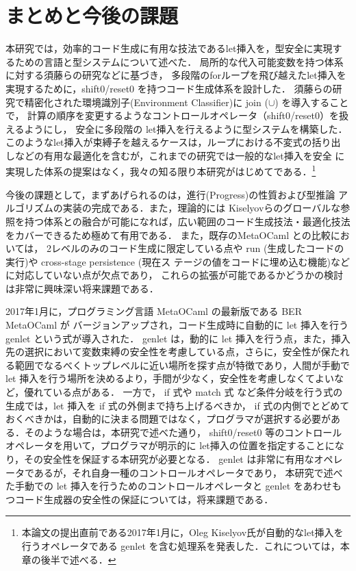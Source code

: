 \chapter{まとめと今後の課題}
\label{cha:conc}
本研究では，効率的コード生成に有用な技法であるlet挿入を，型安全に実現す
るための言語と型システムについて述べた．
局所的な代入可能変数を持つ体系に対する須藤らの研究\cite{Sudo2014}などに基づき，
多段階のforループを飛び越えたlet挿入を実現するために，shift0/reset0 を持つコード生成体系を設計した．
須藤らの研究で精密化された環境識別子(Environment Classifier)に join ($\cup$) を導入することで，
計算の順序を変更するようなコントロールオペレータ（shift0/reset0）を扱えるようにし，
安全に多段階の let挿入を行えるように型システムを構築した．
このようなlet挿入が束縛子を越えるケースは，ループにおける不変式の括り出
しなどの有用な最適化を含むが，これまでの研究では一般的なlet挿入を安全
に実現した体系の提案はなく，我々の知る限り本研究がはじめてである．\footnote{本論文の提出直前である2017年1月に，Oleg Kiselyov氏が自動的なlet挿入を行うオペレータである genlet を含む処理系を発表した．これについては，本章の後半で述べる．}

今後の課題として，まずあげられるのは，進行(Progress)の性質および型推論
アルゴリズムの実装の完成である．また，理論的には Kiselyovらのグローバルな参
照を持つ体系との融合が可能になれば，広い範囲のコード生成技法・最適化技法
をカバーできるため極めて有用である．
また，既存のMetaOCaml との比較においては，
2レベルのみのコード生成に限定している点や
run (生成したコードの実行)や cross-stage persistence (現在ス
テージの値をコードに埋め込む機能)などに対応していない点が欠点であり，
これらの拡張が可能であるかどうかの検討は非常に興味深い将来課題である．

2017年1月に，プログラミング言語 MetaOCaml の最新版である BER MetaOCaml が バージョンアップされ，コード生成時に自動的に let 挿入を行う genlet という式が導入された．
genlet は，動的に let 挿入を行う点，また，挿入先の選択において変数束縛の安全性を考慮している点，さらに，安全性が保たれる範囲でなるべくトップレベルに近い場所を探す点が特徴であり，人間が手動で let 挿入を行う場所を決めるより，手間が少なく，安全性を考慮しなくてよいなど，優れている点がある．
一方で， if 式や match 式 など条件分岐を行う式の生成では，let 挿入を if 式の外側まで持ち上げるべきか， if 式の内側でとどめておくべきかは，自動的に決まる問題ではなく，プログラマが選択する必要がある．そのような場合は，本研究で述べた通り， shift0/reset0 等のコントロールオペレータを用いて，プログラマが明示的に let挿入の位置を指定することになり，その安全性を保証する本研究が必要となる．
genlet は非常に有用なオペレータであるが，それ自身一種のコントロールオペレータであり，
本研究で述べた手動での let 挿入を行うためのコントロールオペレータと genlet をあわせもつコード生成器の安全性の保証については，将来課題である．


